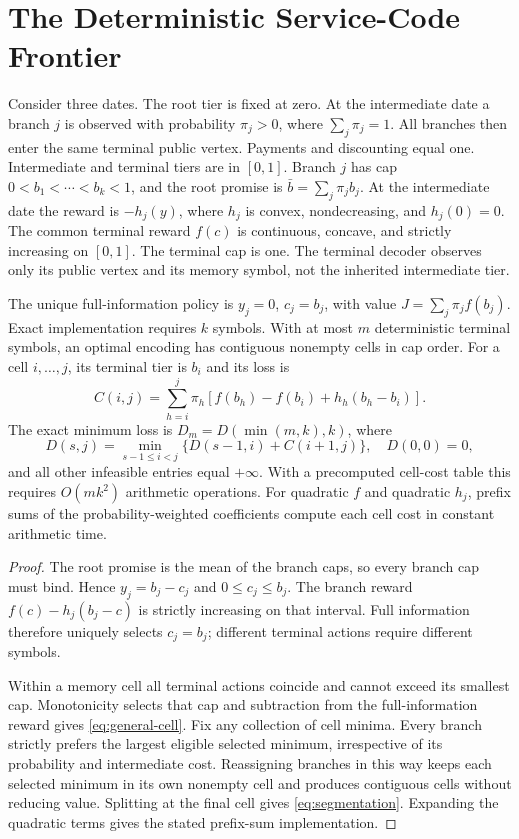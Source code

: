 \section{The Deterministic Service-Code Frontier}
Consider three dates. The root tier is fixed at zero. At the intermediate date a branch $j$ is observed with probability $\pi_j>0$, where $\sum_j\pi_j=1$. All branches then enter the same terminal public vertex. Payments and discounting equal one. Intermediate and terminal tiers are in $[0,1]$. Branch $j$ has cap $0<b_1<\cdots<b_k<1$, and the root promise is $\bar b=\sum_j\pi_jb_j$. At the intermediate date the reward is $-h_j(y)$, where $h_j$ is convex, nondecreasing, and $h_j(0)=0$. The common terminal reward $f(c)$ is continuous, concave, and strictly increasing on $[0,1]$. The terminal cap is one. The terminal decoder observes only its public vertex and its memory symbol, not the inherited intermediate tier.

\begin{theorem}\label{thm:frontier}
The unique full-information policy is $y_j=0$, $c_j=b_j$, with value $J=\sum_j\pi_j f(b_j)$. Exact implementation requires $k$ symbols. With at most $m$ deterministic terminal symbols, an optimal encoding has contiguous nonempty cells in cap order. For a cell $i,\ldots,j$, its terminal tier is $b_i$ and its loss is
\begin{equation}\label{eq:general-cell}
 C(i,j)=\sum_{h=i}^j\pi_h\left[f(b_h)-f(b_i)+h_h(b_h-b_i)\right].
\end{equation}
The exact minimum loss is $D_m=D(\min(m,k),k)$, where
\begin{equation}\label{eq:segmentation}
 D(s,j)=\min_{s-1\leq i<j}\{D(s-1,i)+C(i+1,j)\},\quad D(0,0)=0,
\end{equation}
and all other infeasible entries equal $+\infty$. With a precomputed cell-cost table this requires $O(mk^2)$ arithmetic operations. For quadratic $f$ and quadratic $h_j$, prefix sums of the probability-weighted coefficients compute each cell cost in constant arithmetic time.
\end{theorem}
\begin{proof}
The root promise is the mean of the branch caps, so every branch cap must bind. Hence $y_j=b_j-c_j$ and $0\leq c_j\leq b_j$. The branch reward $f(c)-h_j(b_j-c)$ is strictly increasing on that interval. Full information therefore uniquely selects $c_j=b_j$; different terminal actions require different symbols.

Within a memory cell all terminal actions coincide and cannot exceed its smallest cap. Monotonicity selects that cap and subtraction from the full-information reward gives \eqref{eq:general-cell}. Fix any collection of cell minima. Every branch strictly prefers the largest eligible selected minimum, irrespective of its probability and intermediate cost. Reassigning branches in this way keeps each selected minimum in its own nonempty cell and produces contiguous cells without reducing value. Splitting at the final cell gives \eqref{eq:segmentation}. Expanding the quadratic terms gives the stated prefix-sum implementation.
\end{proof}

